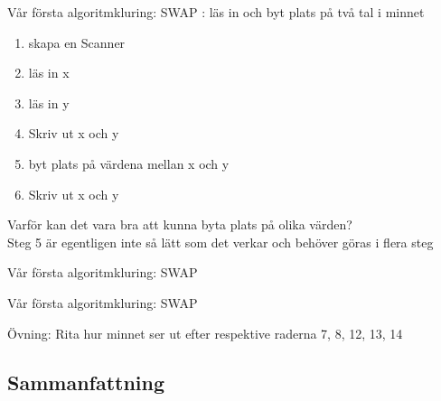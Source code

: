 \documentclass{lecturenotes}
\begin{document}
\begin{Slide}{Vår första algoritmkluring: SWAP}
: läs in och byt plats på två tal i minnet \\ \vspace{1em}
\begin{enumerate}
\item skapa en Scanner
\item  läs in x
\item  läs in y
\item  Skriv ut x och y
\item  byt plats på värdena mellan x och y
\item  Skriv ut x och y
\end{enumerate}
\vspace{2em}
\footnotesize Varför kan det vara bra att kunna byta plats på olika värden? \\
Steg 5 är egentligen inte så lätt som det verkar och behöver göras i flera steg
\end{Slide}


\begin{Slide}{Vår första algoritmkluring: SWAP}

\end{Slide}

\begin{Slide}{Vår första algoritmkluring: SWAP}

\footnotesize Övning: Rita hur minnet ser ut efter respektive raderna 7, 8, 12, 13, 14
\end{Slide}

	
\subsection{Sammanfattning}
\end{document}
